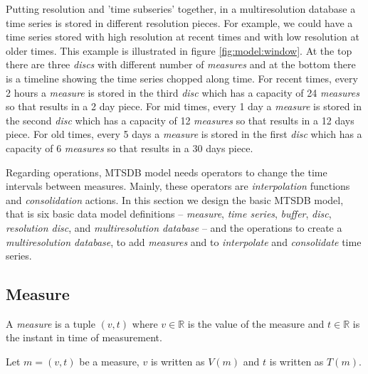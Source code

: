 Putting resolution and 'time subseries' together, in a multiresolution database a time series is stored in different resolution pieces. For example, we could have a time series stored with high resolution at recent times and with low resolution at older times. This example is illustrated in figure \ref{fig:model:window}. At the top there are three \emph{discs} with different number of \emph{measures} and at the bottom there is a timeline showing the time series chopped along time. For recent times, every 2 hours a \emph{measure} is stored in the third \emph{disc} which has a capacity of 24 \emph{measures} so that results in a 2 day piece. For mid times, every 1 day a  \emph{measure} is stored in the second \emph{disc} which has a capacity of 12 \emph{measures} so that results in a 12 days piece. For old times, every 5 days a  \emph{measure} is stored in the first \emph{disc} which has a capacity of 6 \emph{measures} so that results in a 30 days piece. 


Regarding operations, MTSDB model needs operators to change the time intervals between measures. Mainly, these operators are \emph{interpolation} functions and \emph{consolidation} actions. In this section we design the basic MTSDB model, that is six basic data model definitions -- \emph{measure}, \emph{time series}, \emph{buffer}, \emph{disc}, \emph{resolution disc}, and \emph{multiresolution database} -- and the operations to create a \emph{multiresolution database}, to add \emph{measures} and to \emph{interpolate} and \emph{consolidate} time series.



\subsection{Measure}

\begin{definition}[Measure]
  \label{def:measure}
  A \emph{measure} is a tuple $(v,t)$ where $v\in{\mathbb{R}}$ is the
  value of the measure and $t \in \mathbb{R}$ is the instant in time
  of measurement.
\end{definition}

Let $m=(v,t)$ be a measure, $v$ is written as $V(m)$ and $t$
is written as $T(m)$.


